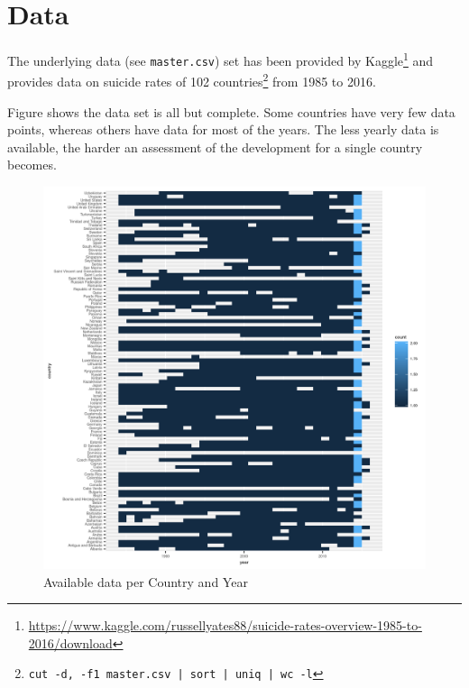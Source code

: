\section{Data}

The underlying data (see \texttt{master.csv}) set has been provided by Kaggle\footnote{\url{https://www.kaggle.com/russellyates88/suicide-rates-overview-1985-to-2016/download}} and provides data on suicide rates of 102 countries\footnote{\texttt{cut -d, -f1 master.csv | sort | uniq | wc -l}} from 1985 to 2016.

Figure  shows the data set is all but complete. Some countries have very few data points, whereas others have data for most of the years. The less yearly data is available, the harder an assessment of the development for a single country becomes.

\begin{figure}
    \centering
    \includegraphics[width=\linewidth]{1-available-data.png}
    \caption{Available data per Country and Year}
    \label{fig:available-data}
\end{figure}
